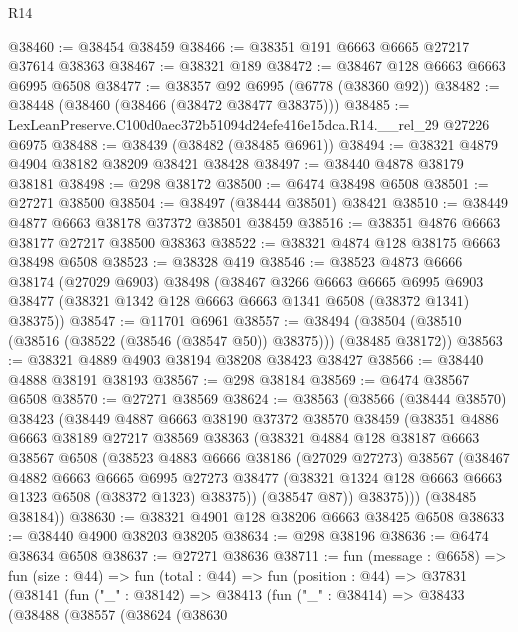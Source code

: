 \begin{lexlean}{R14}
\begin{coremodule}
@38460 := @38454 @38459
@38466 := @38351 @191 @6663 @6665 @27217 @37614 @38363
@38467 := @38321 @189
@38472 := @38467 @128 @6663 @6663 @6995 @6508
@38477 := @38357 @92 @6995 (@6778 (@38360 @92))
@38482 := @38448 (@38460 (@38466 (@38472 @38477 @38375)))
@38485 := LexLeanPreserve.C100d0aec372b51094d24efe416e15dca.R14.__rel_29 @27226 @6975
@38488 := @38439 (@38482 (@38485 @6961))
@38494 := @38321 @4879 @4904 @38182 @38209 @38421 @38428
@38497 := @38440 @4878 @38179 @38181
@38498 := @298 @38172
@38500 := @6474 @38498 @6508
@38501 := @27271 @38500
@38504 := @38497 (@38444 @38501) @38421
@38510 := @38449 @4877 @6663 @38178 @37372 @38501 @38459
@38516 := @38351 @4876 @6663 @38177 @27217 @38500 @38363
@38522 := @38321 @4874 @128 @38175 @6663 @38498 @6508
@38523 := @38328 @419
@38546 := @38523
    @4873
    @6666
    @38174
    (@27029 @6903)
    @38498
    (@38467
      @3266
      @6663
      @6665
      @6995
      @6903
      @38477
      (@38321 @1342 @128 @6663 @6663 @1341 @6508 (@38372 @1341) @38375))
@38547 := @11701 @6961
@38557 := @38494 (@38504 (@38510 (@38516 (@38522 (@38546 (@38547 @50)) @38375))) (@38485 @38172))
@38563 := @38321 @4889 @4903 @38194 @38208 @38423 @38427
@38566 := @38440 @4888 @38191 @38193
@38567 := @298 @38184
@38569 := @6474 @38567 @6508
@38570 := @27271 @38569
@38624 := @38563
    (@38566
      (@38444 @38570)
      @38423
      (@38449
        @4887
        @6663
        @38190
        @37372
        @38570
        @38459
        (@38351
          @4886
          @6663
          @38189
          @27217
          @38569
          @38363
          (@38321
            @4884
            @128
            @38187
            @6663
            @38567
            @6508
            (@38523
              @4883
              @6666
              @38186
              (@27029 @27273)
              @38567
              (@38467
                @4882
                @6663
                @6665
                @6995
                @27273
                @38477
                (@38321 @1324 @128 @6663 @6663 @1323 @6508 (@38372 @1323) @38375))
              (@38547 @87))
            @38375)))
      (@38485 @38184))
@38630 := @38321 @4901 @128 @38206 @6663 @38425 @6508
@38633 := @38440 @4900 @38203 @38205
@38634 := @298 @38196
@38636 := @6474 @38634 @6508
@38637 := @27271 @38636
@38711 := fun (message : @6658) =>
  fun (size : @44) =>
  fun (total : @44) =>
  fun (position : @44) =>
  @37831
    (@38141
      (fun ("_" : @38142) =>
      @38413
        (fun ("_" : @38414) =>
        @38433
          (@38488
            (@38557
              (@38624
                (@38630

\end{coremodule}
\end{lexlean}
